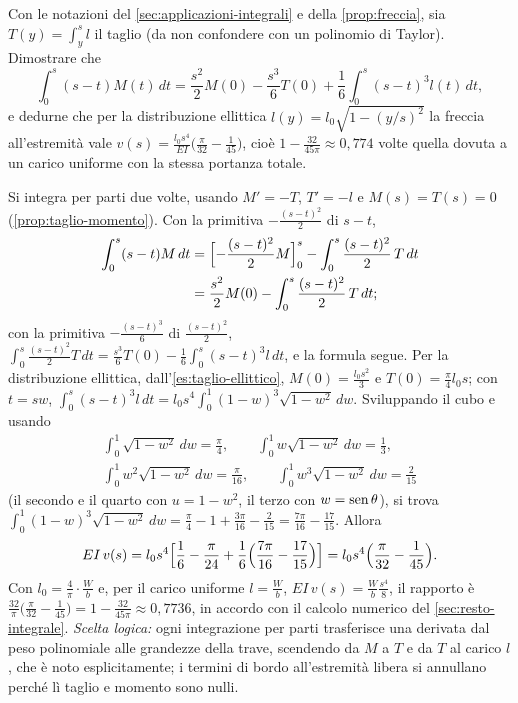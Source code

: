 \begin{esercizio}\label{es:freccia-ellittica}
Con le notazioni del \cref{sec:applicazioni-integrali} e della \cref{prop:freccia}, sia
$T(y)=\int_{y}^{s}l$ il taglio (da non confondere con un polinomio di Taylor). Dimostrare
che
\[
  \int_{0}^{s}(s-t)M(t)\,dt=\frac{s^{2}}2M(0)-\frac{s^{3}}6T(0)+\frac16\int_{0}^{s}(s-t)^{3}l(t)\,dt ,
\]
e dedurne che per la distribuzione ellittica $l(y)=l_{0}\sqrt{1-(y/s)^{2}}$ la freccia
all'estremità vale $v(s)=\frac{l_{0}s^{4}}{EI}\bigl(\frac\pi{32}-\frac1{45}\bigr)$, cioè
$1-\frac{32}{45\pi}\approx0{,}774$ volte quella dovuta a un carico uniforme con la stessa portanza
totale.
\begin{soluzione}
Si integra per parti due volte, usando $M'=-T$, $T'=-l$ e $M(s)=T(s)=0$
(\cref{prop:taglio-momento}). Con la primitiva $-\frac{(s-t)^{2}}2$ di $s-t$,
\[
\begin{aligned}
  \int_{0}^{s}(s-t)M\,dt&=\Bigl[-\frac{(s-t)^{2}}2M\Bigr]_{0}^{s}-\int_{0}^{s}\frac{(s-t)^{2}}2\,T\,dt\\
  &=\frac{s^{2}}2M(0)-\int_{0}^{s}\frac{(s-t)^{2}}2\,T\,dt ;
\end{aligned}
\]
con la primitiva $-\frac{(s-t)^{3}}6$ di $\frac{(s-t)^{2}}2$,
$\int_{0}^{s}\frac{(s-t)^{2}}2T\,dt=\frac{s^{3}}6T(0)-\frac16\int_{0}^{s}(s-t)^{3}l\,dt$, e la formula segue.
Per la distribuzione ellittica, dall'\cref{es:taglio-ellittico}, $M(0)=\frac{l_{0}s^{2}}3$ e
$T(0)=\frac\pi4l_{0}s$; con $t=sw$,
$\int_{0}^{s}(s-t)^{3}l\,dt=l_{0}s^{4}\int_{0}^{1}(1-w)^{3}\sqrt{1-w^{2}}\,dw$. Sviluppando il cubo e usando
\[
\begin{gathered}
  \int_{0}^{1}\!\sqrt{1-w^{2}}\,dw=\frac\pi4, \qquad \int_{0}^{1}\!w\sqrt{1-w^{2}}\,dw=\frac13,\\
  \int_{0}^{1}\!w^{2}\sqrt{1-w^{2}}\,dw=\frac\pi{16}, \qquad \int_{0}^{1}\!w^{3}\sqrt{1-w^{2}}\,dw=\frac2{15}
\end{gathered}
\]
(il secondo e il quarto con $u=1-w^{2}$, il terzo con $w=\operatorname{sen}\theta$), si trova
$\int_{0}^{1}(1-w)^{3}\sqrt{1-w^{2}}\,dw=\frac\pi4-1+\frac{3\pi}{16}-\frac2{15}=\frac{7\pi}{16}-\frac{17}{15}$. Allora
\[
  EI\,v(s)=l_{0}s^{4}\Bigl[\frac16-\frac\pi{24}+\frac16\Bigl(\frac{7\pi}{16}-\frac{17}{15}\Bigr)\Bigr]
  =l_{0}s^{4}\Bigl(\frac\pi{32}-\frac1{45}\Bigr) .
\]
Con $l_{0}=\frac4\pi\cdot\frac Wb$ e, per il carico uniforme $l=\frac Wb$, $EI\,v(s)=\frac{W}{b}\frac{s^{4}}8$, il
rapporto è $\frac{32}\pi\bigl(\frac\pi{32}-\frac1{45}\bigr)=1-\frac{32}{45\pi}\approx0{,}7736$, in accordo con il
calcolo numerico del \cref{sec:resto-integrale}. \emph{Scelta logica:} ogni integrazione
per parti trasferisce una derivata dal peso polinomiale alle grandezze della trave,
scendendo da $M$ a $T$ e da $T$ al carico $l$, che è noto esplicitamente; i termini di
bordo all'estremità libera si annullano perché lì taglio e momento sono nulli.
\end{soluzione}
\end{esercizio}

